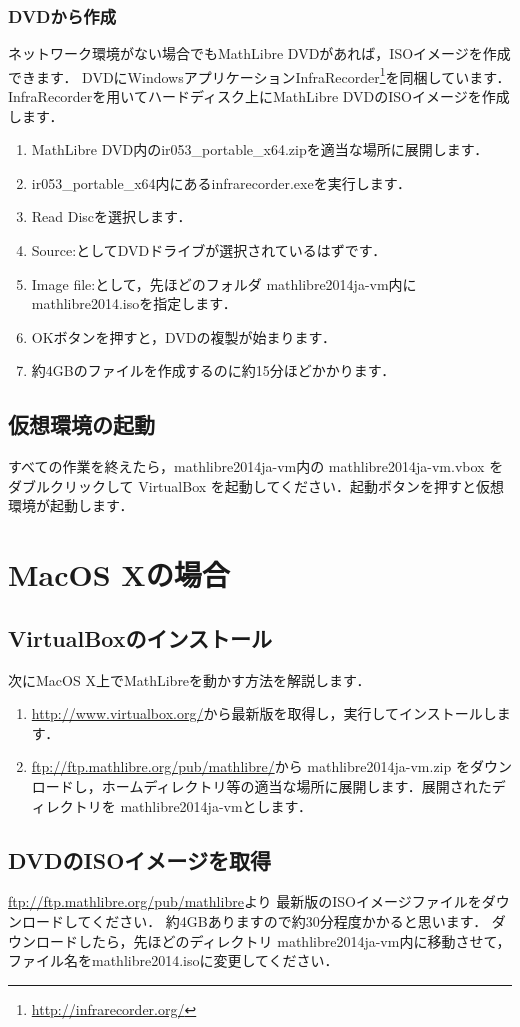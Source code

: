 \documentclass[a4j]{jsarticle}
\newcommand{\ir}{ir053\_portable\_x64}
\newcommand{\vm}{mathlibre2014ja-vm}
\begin{document}
\subsubsection{DVDから作成}
ネットワーク環境がない場合でもMathLibre DVDがあれば，ISOイメージを作成できます．
DVDにWindowsアプリケーションInfraRecorder\footnote{\url{http://infrarecorder.org/}}を同梱しています．
InfraRecorderを用いてハードディスク上にMathLibre DVDのISOイメージを作成
します．
\begin{enumerate}
 \item MathLibre DVD内の\ir.zipを適当な場所に展開します．
 \item \ir 内にあるinfrarecorder.exeを実行します．
 \item Read Discを選択します．
 \item Source:としてDVDドライブが選択されているはずです．
 \item Image file:として，先ほどのフォルダ \vm 内にmathlibre2014.isoを指定します．
 \item OKボタンを押すと，DVDの複製が始まります．
 \item 約4GBのファイルを作成するのに約15分ほどかかります．
\end{enumerate}

\subsection{仮想環境の起動}
すべての作業を終えたら，\vm 内の \vm.vbox をダブルクリックして
VirtualBox を起動してください．起動ボタンを押すと仮想環境が起動します．

\section{MacOS Xの場合}
\subsection{VirtualBoxのインストール}
次にMacOS X上でMathLibreを動かす方法を解説します．
\begin{enumerate}
 \item \url{http://www.virtualbox.org/}から最新版を取得し，実行してインストールします．
 \item \url{ftp://ftp.mathlibre.org/pub/mathlibre/}から \vm.zip をダウンロードし，ホームディレクトリ等の適当な場所に展開します．展開されたディレクトリを \vm とします．
\end{enumerate}

\subsection{DVDのISOイメージを取得}
\url{ftp://ftp.mathlibre.org/pub/mathlibre}より
最新版のISOイメージファイルをダウンロードしてください．
約4GBありますので約30分程度かかると思います．
ダウンロードしたら，先ほどのディレクトリ \vm 内に移動させて，ファイル名をmathlibre2014.isoに変更してください．
\end{document}
